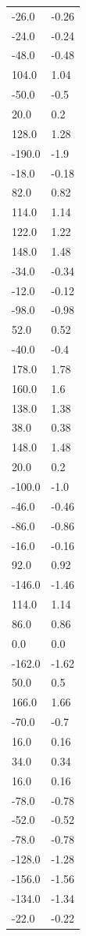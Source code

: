 \begin{longtable}{ll}
-26.0 & -0.26 \\
-24.0 & -0.24 \\
-48.0 & -0.48 \\
104.0 & 1.04 \\
-50.0 & -0.5 \\
20.0 & 0.2 \\
128.0 & 1.28 \\
-190.0 & -1.9 \\
-18.0 & -0.18 \\
82.0 & 0.82 \\
114.0 & 1.14 \\
122.0 & 1.22 \\
148.0 & 1.48 \\
-34.0 & -0.34 \\
-12.0 & -0.12 \\
-98.0 & -0.98 \\
52.0 & 0.52 \\
-40.0 & -0.4 \\
178.0 & 1.78 \\
160.0 & 1.6 \\
138.0 & 1.38 \\
38.0 & 0.38 \\
148.0 & 1.48 \\
20.0 & 0.2 \\
-100.0 & -1.0 \\
-46.0 & -0.46 \\
-86.0 & -0.86 \\
-16.0 & -0.16 \\
92.0 & 0.92 \\
-146.0 & -1.46 \\
114.0 & 1.14 \\
86.0 & 0.86 \\
0.0 & 0.0 \\
-162.0 & -1.62 \\
50.0 & 0.5 \\
166.0 & 1.66 \\
-70.0 & -0.7 \\
16.0 & 0.16 \\
34.0 & 0.34 \\
16.0 & 0.16 \\
-78.0 & -0.78 \\
-52.0 & -0.52 \\
-78.0 & -0.78 \\
-128.0 & -1.28 \\
-156.0 & -1.56 \\
-134.0 & -1.34 \\
-22.0 & -0.22 \\

\end{longtable}
